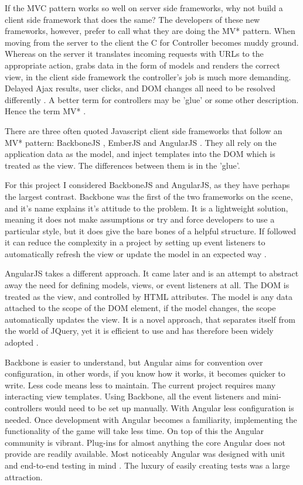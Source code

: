 If the MVC pattern works so well on server side frameworks, why not build a client side framework that does the same? The developers of these new frameworks, however, prefer to call what they are doing the MV* pattern. When moving from the server to the client the C for Controller becomes muddy ground. Whereas on the server it translates incoming requests with URLs to the appropriate action, grabs data in the form of models and renders the correct view, in the client side framework the controller's job is much more demanding. Delayed Ajax results, user clicks, and DOM changes all need to be resolved differently \cite{SPABook}. A better term for controllers may be 'glue' or some other description. Hence the term MV* \cite{DevBBoneApps}.
	
There are three often quoted Javascript client side frameworks that follow an MV* pattern: BackboneJS \cite{BBoneJS}, EmberJS \cite{Ember} and AngularJS \cite{AngularJS}. They all rely on the application data as the model, and inject templates into the DOM which is treated as the view. The differences between them is in the 'glue'.
	
For this project I considered BackboneJS and AngularJS, as they have perhaps the largest contrast. Backbone was the first of the two frameworks on the scene, and it's name explains it's attitude to the problem. It is a lightweight solution, meaning it does not make assumptions or try and force developers to use a particular style, but it does give the bare bones of a helpful structure. If followed it can reduce the complexity in a project by setting up event listeners to automatically refresh the view or update the model in an expected way \cite{DevBBoneApps}.
	
AngularJS takes a different approach. It came later and is an attempt to abstract away the need for defining models, views, or event listeners at all. The DOM is treated as the view, and controlled by HTML attributes. The model is any data attached to the scope of the DOM element, if the model changes, the scope automatically updates the view. It is a novel approach, that separates itself from the world of JQuery, yet it is efficient to use and has therefore been widely adopted \cite{AngOverBB}.
	
Backbone is easier to understand, but Angular aims for convention over configuration, in other words, if you know how it works, it becomes quicker to write. Less code means less to maintain. The current project requires many interacting view templates. Using Backbone, all the event listeners and mini-controllers would need to be set up manually. With Angular less configuration is needed. Once development with Angular becomes a familiarity, implementing the  functionality of the game will take less time. On top of this the Angular community is vibrant. Plug-ins for almost anything the core Angular does not provide are readily available. Most noticeably Angular was designed with unit and end-to-end testing in mind \cite{Angular}. The luxury of easily creating tests was a large attraction.
	
